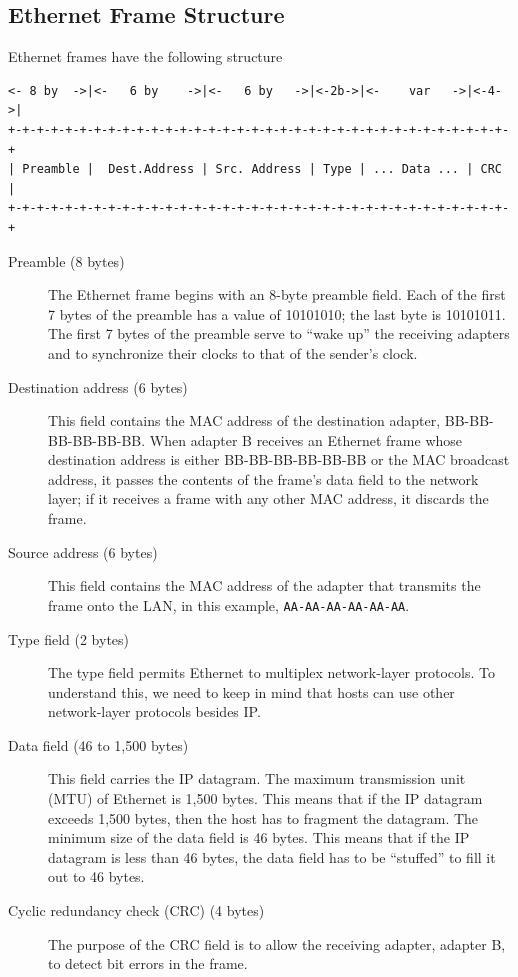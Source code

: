 \documentclass{article}
\begin{document}
\subsection*{Ethernet Frame Structure}
Ethernet frames have the following structure
    \begin{lstlisting}
<- 8 by  ->|<-   6 by    ->|<-   6 by   ->|<-2b->|<-    var   ->|<-4->|
+-+-+-+-+-+-+-+-+-+-+-+-+-+-+-+-+-+-+-+-+-+-+-+-+-+-+-+-+-+-+-+-+-+-+-+
| Preamble |  Dest.Address | Src. Address | Type | ... Data ... | CRC |
+-+-+-+-+-+-+-+-+-+-+-+-+-+-+-+-+-+-+-+-+-+-+-+-+-+-+-+-+-+-+-+-+-+-+-+
    \end{lstlisting}
\begin{description}
    \item[Preamble (8 bytes)] The Ethernet frame begins with an 8-byte preamble field.
    Each of the first 7 bytes of the preamble has a value of 10101010; the last byte is
    10101011. The first 7 bytes of the preamble serve to “wake up” the receiving
    adapters and to synchronize their clocks to that of the sender’s clock.
    
    \item[Destination address (6 bytes)] This field contains the MAC address of the destination
    adapter, BB-BB-BB-BB-BB-BB. When adapter B receives an Ethernet
    frame whose destination address is either BB-BB-BB-BB-BB-BB or the
    MAC broadcast address, it passes the contents of the frame’s data field to the
    network layer; if it receives a frame with any other MAC address, it discards
    the frame.
    
    \item[Source address (6 bytes)] This field contains the MAC address of the adapter that
    transmits the frame onto the LAN, in this example, {\tt AA-AA-AA-AA-AA-AA}.
    
    \item[Type field (2 bytes)] The type field permits Ethernet to multiplex network-layer
    protocols. To understand this, we need to keep in mind that hosts can use other
    network-layer protocols besides IP.
    
    \item[Data field (46 to 1,500 bytes)] This field carries the IP datagram. The maximum
    transmission unit (MTU) of Ethernet is 1,500 bytes. This means that if the IP
    datagram exceeds 1,500 bytes, then the host has to fragment the datagram. The minimum size of the data field is 46 bytes. This means that if the IP datagram is less than 46 bytes, the data field has to be “stuffed” to fill it out to 46 bytes.
    
    \item[Cyclic redundancy check (CRC) (4 bytes)] The purpose
    of the CRC field is to allow the receiving adapter, adapter B, to detect bit
    errors in the frame.
\end{description}
\end{document}
